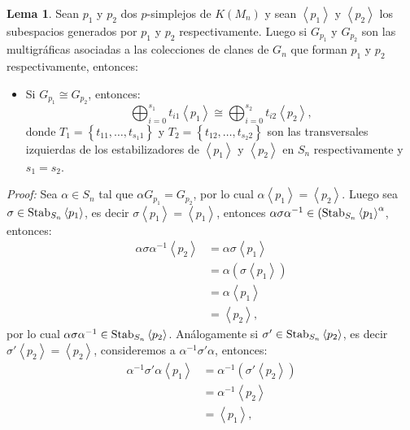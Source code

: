 \documentclass[12pt]{book}
\theoremstyle{definition}
\newtheorem{lemma}[theorem]{Lema}
\newcounter{in}
\begin{document}
\begin{lemma}
\label{lema_s_n}
Sean $p_{1}$ y $p_{2}$ dos $p$-simplejos de $K(M_{n})$ y sean $\left \langle p_{1} \right \rangle$ y $\left \langle p_{2} \right \rangle$ los subespacios generados por $p_{1}$ y $p_{2}$ respectivamente. Luego si $G_{p_{1}}$ y $G_{p_{2}}$ son las multigráficas asociadas a las colecciones de clanes de $G_{n}$ que forman $p_{1}$ y $p_{2}$ respectivamente, entonces:
\begin{itemize}
\item Si $G_{p_{1}} \cong G_{p_{2}}$, entonces:
$$\bigoplus_{i=0}^{s_{1}} t_{i1}  \left \langle p_{1} \right \rangle \cong \bigoplus_{i=0}^{s_{2}} t_{i2} \left \langle p_{2} \right \rangle,$$
donde $T_{1} = \left \{ t_{11}, \ldots, t_{s_{1}1} \right \}$ y $T_{2} = \left \{ t_{12}, \ldots, t_{s_{2}2} \right \}$ son las transversales izquierdas de los estabilizadores de $\left \langle p_{1} \right \rangle$ y $\left \langle p_{2} \right \rangle$ en $S_{n}$ respectivamente y $s_{1} = s_{2}$.
\end{itemize} 
\end{lemma}
\textit{Proof:}
Sea $\alpha \in S_{n}$ tal que $\alpha G_{p_{1}} = G_{p_{2}}$, por lo cual $\alpha \left \langle p_{1} \right \rangle = \left \langle p_{2} \right \rangle$.
Luego sea $\sigma \in \textup{Stab}_{S_{n}}  \left \langle p_{1} \right \rangle$, es decir $\sigma  \left \langle p_{1} \right \rangle =  \left \langle p_{1} \right \rangle$, entonces $\alpha \sigma \alpha^{-1} \in ( \textup{Stab}_{S_{n}}  \left \langle p_{1} \right \rangle^{\alpha}$, entonces:
\begin{equation*}
\begin{aligned}
\alpha \sigma \alpha^{-1}  \left \langle p_{2} \right \rangle &= \alpha \sigma  \left \langle p_{1} \right \rangle \\
& = \alpha (\sigma  \left \langle p_{1} \right \rangle) \\
& = \alpha  \left \langle p_{1} \right \rangle \\
& =  \left \langle p_{2} \right \rangle,
\end{aligned}
\end{equation*}
por lo cual $\alpha \sigma \alpha^{-1} \in \textup{Stab}_{S_{n}}  \left \langle p_{2} \right \rangle$. Análogamente si $\sigma' \in \textup{Stab}_{S_{n}}  \left \langle p_{2} \right \rangle$, es decir $\sigma'  \left \langle p_{2} \right \rangle =  \left \langle p_{2} \right \rangle$, consideremos a $\alpha^{-1} \sigma' \alpha$, entonces:
\begin{equation*}
\begin{aligned}
\alpha^{-1} \sigma' \alpha  \left \langle p_{1} \right \rangle & = \alpha^{-1} (\sigma'  \left \langle p_{2} \right \rangle) \\
& = \alpha^{-1}  \left \langle p_{2} \right \rangle \\
& =  \left \langle p_{1} \right \rangle,
\end{aligned}
\end{equation*}
\end{document}
